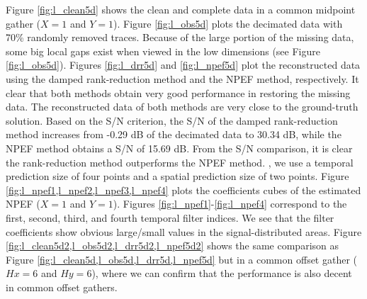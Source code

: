 Figure \ref{fig:l_clean5d} shows the clean and complete data in a common midpoint gather ($X=1$ and $Y=1$). Figure \ref{fig:l_obs5d} plots the decimated data with 70\% randomly removed traces. Because of the large portion of the missing data, some big local gaps exist when viewed in the low dimensions (see Figure \ref{fig:l_obs5d}). Figures \ref{fig:l_drr5d} and \ref{fig:l_npef5d} plot the reconstructed data using the damped rank-reduction method and the NPEF method, respectively. It clear that both methods obtain very good performance in restoring the missing data. The reconstructed data of both methods are very close to the ground-truth solution. Based on the S/N criterion, the S/N of the damped rank-reduction method increases from -0.29 dB of the decimated data to 30.34 dB, while the NPEF method obtains a S/N of 15.69 dB. From the S/N comparison, it is clear the rank-reduction method outperforms the NPEF method. , we use a temporal prediction size of four points and a spatial prediction size of two points.  Figure \ref{fig:l_npef1,l_npef2,l_npef3,l_npef4} plots the coefficients cubes of the estimated NPEF ($X=1$ and $Y=1$). Figures \ref{fig:l_npef1}-\ref{fig:l_npef4} correspond to the first, second, third, and fourth temporal filter indices. We see that the filter coefficients show obvious large/small values in the signal-distributed areas. Figure \ref{fig:l_clean5d2,l_obs5d2,l_drr5d2,l_npef5d2} shows the same comparison as Figure \ref{fig:l_clean5d,l_obs5d,l_drr5d,l_npef5d} but in a common offset gather ($Hx=6$ and $Hy=6$), where we can confirm that the performance is also decent in common offset gathers. 


